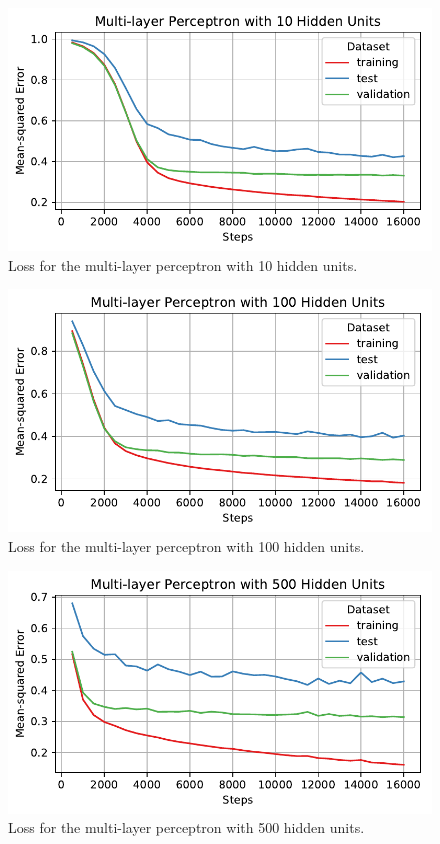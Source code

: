 \documentclass[letterpaper,11pt]{article}
\begin{document}
\begin{enumerate}
    \begin{figure}
      \centering
      \includegraphics{problem6/mlp10_loss.pdf}
      \caption{Loss for the multi-layer perceptron with 10 hidden units.}
      \label{fig:mlp10_loss}
    \end{figure}
    
    \begin{figure}
      \centering
      \includegraphics{problem6/mlp100_loss.pdf}
      \caption{Loss for the multi-layer perceptron with 100 hidden units.}
      \label{fig:mlp100_loss}
    \end{figure}
    
    \begin{figure}
      \centering
      \includegraphics{problem6/mlp500_loss.pdf}
      \caption{Loss for the multi-layer perceptron with 500 hidden units.}
      \label{fig:mlp500_loss}
    \end{figure}


\end{enumerate}
\end{document}
